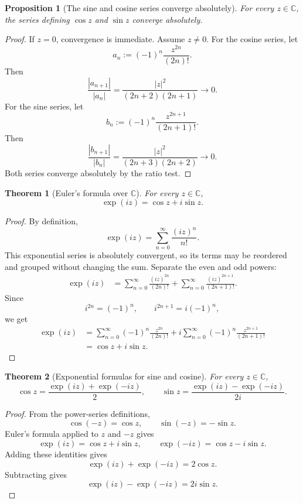 \documentclass[11pt]{article}
\newtheorem{proposition}{Proposition}[section]
\newtheorem{theorem}{Theorem}[section]
\newcommand{\C}{\mathbb{C}}
\newcommand{\abs}[1]{\left|#1\right|}
\begin{document}
\begin{proposition}[The sine and cosine series converge absolutely]
For every $z\in\C$, the series defining $\cos z$ and $\sin z$ converge absolutely.
\end{proposition}

\begin{proof}
If $z=0$, convergence is immediate.
Assume $z\ne0$.
For the cosine series, let
\[
  a_{n}:=(-1)^{n}\frac{z^{2n}}{(2n)!}.
\]
Then
\[
  \frac{\abs{a_{n+1}}}{\abs{a_{n}}}
  =
  \frac{\abs{z}^{2}}{(2n+2)(2n+1)}
  \to0.
\]
For the sine series, let
\[
  b_{n}:=(-1)^{n}\frac{z^{2n+1}}{(2n+1)!}.
\]
Then
\[
  \frac{\abs{b_{n+1}}}{\abs{b_{n}}}
  =
  \frac{\abs{z}^{2}}{(2n+3)(2n+2)}
  \to0.
\]
Both series converge absolutely by the ratio test.
\end{proof}

\begin{theorem}[Euler's formula over $\C$]
For every $z\in\C$,
\[
  \exp(iz)=\cos z+i\sin z.
\]
\end{theorem}

\begin{proof}
By definition,
\[
  \exp(iz)=\sum_{n=0}^{\infty}\frac{(iz)^{n}}{n!}.
\]
This exponential series is absolutely convergent, so its terms may be reordered and grouped without changing the sum.
Separate the even and odd powers:
\[
\begin{aligned}
  \exp(iz)
    &= \sum_{n=0}^{\infty}\frac{(iz)^{2n}}{(2n)!}
       +\sum_{n=0}^{\infty}\frac{(iz)^{2n+1}}{(2n+1)!}.
\end{aligned}
\]
Since
\[
  i^{2n}=(-1)^{n},
  \qquad
  i^{2n+1}=i(-1)^{n},
\]
we get
\[
\begin{aligned}
  \exp(iz)
    &= \sum_{n=0}^{\infty}(-1)^{n}\frac{z^{2n}}{(2n)!}
       + i\sum_{n=0}^{\infty}(-1)^{n}\frac{z^{2n+1}}{(2n+1)!} \\
    &= \cos z+i\sin z.
\end{aligned}
\]
\end{proof}

\begin{theorem}[Exponential formulas for sine and cosine]
For every $z\in\C$,
\[
  \boxed{\cos z=\frac{\exp(iz)+\exp(-iz)}{2}},
  \qquad
  \boxed{\sin z=\frac{\exp(iz)-\exp(-iz)}{2i}}.
\]
\end{theorem}

\begin{proof}
From the power-series definitions,
\[
  \cos(-z)=\cos z,
  \qquad
  \sin(-z)=-\sin z.
\]
Euler's formula applied to $z$ and $-z$ gives
\[
  \exp(iz)=\cos z+i\sin z,
  \qquad
  \exp(-iz)=\cos z-i\sin z.
\]
Adding these identities gives
\[
  \exp(iz)+\exp(-iz)=2\cos z.
\]
Subtracting gives
\[
  \exp(iz)-\exp(-iz)=2i\sin z.
\]
\end{proof}
\end{document}
